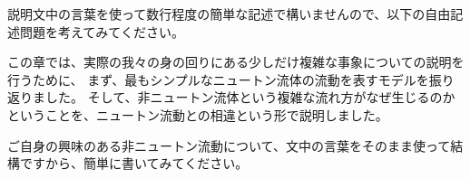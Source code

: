 \documentclass[uplatex,dvipdfmx,a4paper,11pt]{jsarticle}
\begin{document}
説明文中の言葉を使って数行程度の簡単な記述で構いませんので、以下の自由記述問題を考えてみてください。
\begin{qlist}
\qitem この章では、実際の我々の身の回りにある少しだけ複雑な事象についての説明を行うために、
まず、最もシンプルなニュートン流体の流動を表すモデルを振り返りました。
そして、非ニュートン流体という複雑な流れ方がなぜ生じるのかということを、ニュートン流動との相違という形で説明しました。

ご自身の興味のある非ニュートン流動について、文中の言葉をそのまま使って結構ですから、簡単に書いてみてください。
\end{qlist}

\clearpage
\end{document}
